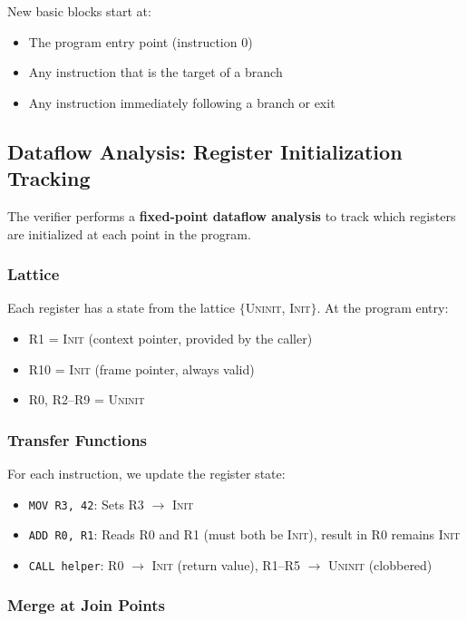 \documentclass[11pt,letterpaper]{article}
\begin{document}
New basic blocks start at:
\begin{itemize}
    \item The program entry point (instruction 0)
    \item Any instruction that is the target of a branch
    \item Any instruction immediately following a branch or exit
\end{itemize}

\subsection{Dataflow Analysis: Register Initialization Tracking}

The verifier performs a \textbf{fixed-point dataflow analysis} to track which registers are initialized at each point in the program.

\subsubsection{Lattice}

Each register has a state from the lattice $\{$\textsc{Uninit}, \textsc{Init}$\}$. At the program entry:
\begin{itemize}
    \item R1 = \textsc{Init} (context pointer, provided by the caller)
    \item R10 = \textsc{Init} (frame pointer, always valid)
    \item R0, R2--R9 = \textsc{Uninit}
\end{itemize}

\subsubsection{Transfer Functions}

For each instruction, we update the register state:
\begin{itemize}
    \item \texttt{MOV R3, 42}: Sets R3 $\to$ \textsc{Init}
    \item \texttt{ADD R0, R1}: Reads R0 and R1 (must both be \textsc{Init}), result in R0 remains \textsc{Init}
    \item \texttt{CALL helper}: R0 $\to$ \textsc{Init} (return value), R1--R5 $\to$ \textsc{Uninit} (clobbered)
\end{itemize}

\subsubsection{Merge at Join Points}
\end{document}
